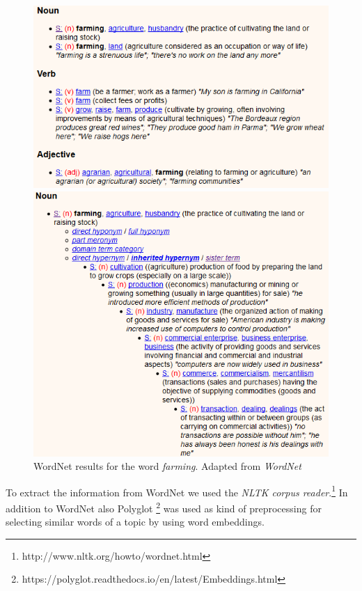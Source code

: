 \begin{figure}
	\begin{minipage}{0.5\textwidth}
		\includegraphics[width=\textwidth]{gfx/Wordnet/farming.png}
	\end{minipage}
	\begin{minipage}{0.5\textwidth}
		\includegraphics[width=\textwidth]{gfx/Wordnet/farmingTree.png}
	\end{minipage}
	\caption[WordNet results for the word \textit{farming}]{WordNet results for the word \textit{farming}. Adapted from \textit{WordNet}}
	\label{pic:Wordnet}
\end{figure}

To extract the information from WordNet we used the \textit{NLTK corpus reader}.\footnote{http://www.nltk.org/howto/wordnet.html} In addition to WordNet also Polyglot \footnote{https://polyglot.readthedocs.io/en/latest/Embeddings.html} was used as kind of preprocessing for selecting similar words of a topic by using word embeddings.
